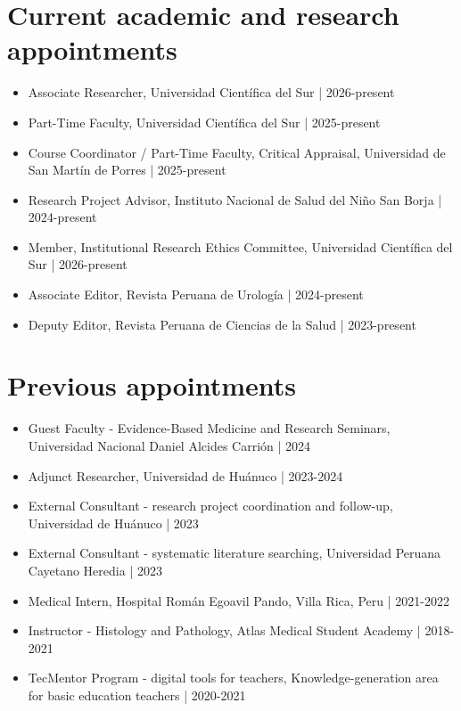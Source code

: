 \documentclass[11pt,a4paper]{article}
\begin{document}
\section*{Current academic and research appointments}
\begin{itemize}[leftmargin=*,itemsep=4pt]
\item Associate Researcher, Universidad Científica del Sur | 2026-present
\item Part-Time Faculty, Universidad Científica del Sur | 2025-present
\item Course Coordinator / Part-Time Faculty, Critical Appraisal, Universidad de San Martín de Porres | 2025-present
\item Research Project Advisor, Instituto Nacional de Salud del Niño San Borja | 2024-present
\item Member, Institutional Research Ethics Committee, Universidad Científica del Sur | 2026-present
\item Associate Editor, Revista Peruana de Urología | 2024-present
\item Deputy Editor, Revista Peruana de Ciencias de la Salud | 2023-present
\end{itemize}
\section*{Previous appointments}
\begin{itemize}[leftmargin=*,itemsep=4pt]
\item Guest Faculty - Evidence-Based Medicine and Research Seminars, Universidad Nacional Daniel Alcides Carrión | 2024
\item Adjunct Researcher, Universidad de Huánuco | 2023-2024
\item External Consultant - research project coordination and follow-up, Universidad de Huánuco | 2023
\item External Consultant - systematic literature searching, Universidad Peruana Cayetano Heredia | 2023
\item Medical Intern, Hospital Román Egoavil Pando, Villa Rica, Peru | 2021-2022
\item Instructor - Histology and Pathology, Atlas Medical Student Academy | 2018-2021
\item TecMentor Program - digital tools for teachers, Knowledge-generation area for basic education teachers | 2020-2021
\end{itemize}
\end{document}
